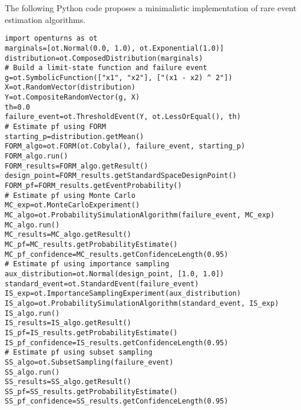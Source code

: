 \begin{otexample}
    The following Python code proposes a minimalistic \ot implementation of rare event estimation algorithms. 
    \lstset{style=mystyle, language=python}
%
\begin{lstlisting}
import openturns as ot
marginals=[ot.Normal(0.0, 1.0), ot.Exponential(1.0)]
distribution=ot.ComposedDistribution(marginals)
# Build a limit-state function and failure event
g=ot.SymbolicFunction(["x1", "x2"], ["(x1 - x2) ^ 2"])
X=ot.RandomVector(distribution)
Y=ot.CompositeRandomVector(g, X)
th=0.0
failure_event=ot.ThresholdEvent(Y, ot.LessOrEqual(), th)
# Estimate pf using FORM
starting_p=distribution.getMean()
FORM_algo=ot.FORM(ot.Cobyla(), failure_event, starting_p)
FORM_algo.run()
FORM_results=FORM_algo.getResult()
design_point=FORM_results.getStandardSpaceDesignPoint()
FORM_pf=FORM_results.getEventProbability()
# Estimate pf using Monte Carlo 
MC_exp=ot.MonteCarloExperiment()
MC_algo=ot.ProbabilitySimulationAlgorithm(failure_event, MC_exp)
MC_algo.run()
MC_results=MC_algo.getResult()
MC_pf=MC_results.getProbabilityEstimate()
MC_pf_confidence=MC_results.getConfidenceLength(0.95)
# Estimate pf using importance sampling
aux_distribution=ot.Normal(design_point, [1.0, 1.0])
standard_event=ot.StandardEvent(failure_event)
IS_exp=ot.ImportanceSamplingExperiment(aux_distribution)
IS_algo=ot.ProbabilitySimulationAlgorithm(standard_event, IS_exp)
IS_algo.run()
IS_results=IS_algo.getResult()
IS_pf=IS_results.getProbabilityEstimate()
IS_pf_confidence=IS_results.getConfidenceLength(0.95)
# Estimate pf using subset sampling
SS_algo=ot.SubsetSampling(failure_event)
SS_algo.run()
SS_results=SS_algo.getResult()
SS_pf=SS_results.getProbabilityEstimate()
SS_pf_confidence=SS_results.getConfidenceLength(0.95)
\end{lstlisting}
%
\end{otexample}


